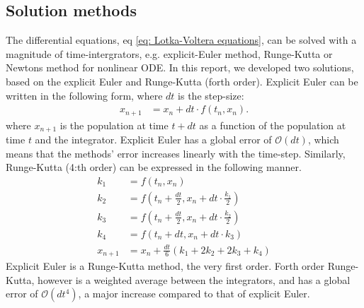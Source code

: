 \documentclass[a4paper]{article}
\begin{document}
\subsection{Solution methods}
The differential equations, eq \eqref{eq: Lotka-Voltera equations}, can be solved with a magnitude of time-intergrators, e.g. explicit-Euler method, Runge-Kutta or Newtons method for nonlinear ODE.
In this report, we developed two solutions, based on the explicit Euler and Runge-Kutta (forth order).
Explicit Euler can be written in the following form, where $dt$ is the step-size:
\begin{align}
    x_{n + 1} &= x_n + dt \cdot f(t_n, x_n).\label{eq: explicit euler}
\end{align}where $x_{n + 1}$ is the population at time $t + dt$ as a function of the population at time $t$ and the integrator. Explicit Euler has a global error of $\mathcal{O}(dt)$, which means that the methods' error increases linearly with the time-step.
Similarly, Runge-Kutta (4:th order) can be expressed in the following manner.
\begin{align}
    k_1 &= f(t_n, x_n)\nonumber\\
    k_2 &= f\left(t_n + \frac{dt}{2}, x_n + dt\cdot\frac{k_1}{2}\right)\nonumber\\
    k_3 &= f\left(t_n + \frac{dt}{2}, x_n + dt\cdot\frac{k_2}{2}\right)\nonumber\\
    k_4 &= f\left(t_n + dt, x_n + dt\cdot k_3\right)\nonumber\\
    x_{n+1} &= x_n + \frac{dt}{6}\left(k_1 + 2k_2 + 2k_3 + k_4\right)\label{eq: runge kutta}
\end{align}Explicit Euler is a Runge-Kutta method, the very first order. Forth order Runge-Kutta, however is a weighted average between the integrators, and has a global error of $\mathcal{O}(dt^4)$, a major increase compared to that of explicit Euler.
\end{document}
